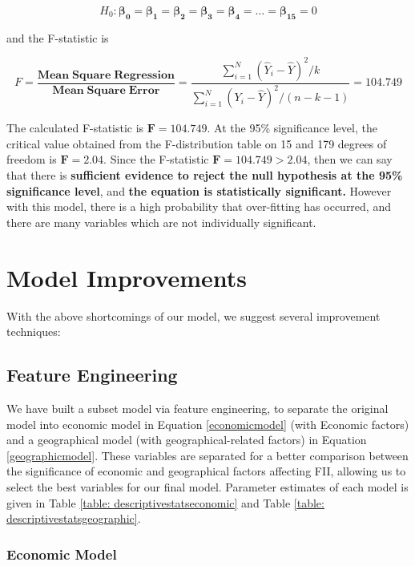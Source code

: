 \documentclass{article}
\begin{document}
\begin{equation}
    H_0: \bm{\beta_0} = \bm{\beta_1} = \bm{\beta_2} = \bm{\beta_3} = \bm{\beta_4} = \dots = \bm{\beta_{15}} = 0
\end{equation}

\noindent and the F-statistic is 

\begin{equation}\label{eqn:F-stat}
    F = \frac{\mathbf{Mean \; Square \; Regression}}{\mathbf{Mean \; Square \;  Error}} = \frac{{\sum_{i=1}^N (\hat{Y}_i - \hat{Y})^2} / k}{\sum_{i=1}^N (Y_i- \hat{Y})^2/(n-k-1)} = 104.749
\end{equation}

\noindent The calculated F-statistic is $\bm{F = 104.749}$. At the 95\% significance level, the critical value obtained from the F-distribution table on 15 and 179 degrees of freedom is $\bm{F = 2.04}$. Since the F-statistic $\bm{F = 104.749 > 2.04}$, then we can say that there is \textbf{sufficient evidence to reject the null hypothesis at the 95\% significance level}, and \textbf{the equation is statistically significant.} However with this model, there is a high probability that over-fitting has occurred, and there are many variables which are not individually significant. 

\section{Model Improvements}
With the above shortcomings of our model, we suggest several improvement techniques:

\subsection{Feature Engineering}\label{sec: feateng}
We have built a subset model via feature engineering, to separate the original model into economic model in Equation \ref{economicmodel} (with Economic factors) and a geographical model (with geographical-related factors) in Equation \ref{geographicmodel}. These variables are separated for a better comparison between the significance of economic and geographical factors affecting FII, allowing us to select the best variables for our final model. Parameter estimates of each model is given in Table \ref{table: descriptivestatseconomic} and Table \ref{table: descriptivestatsgeographic}.

\subsubsection{Economic Model}
\end{document}
